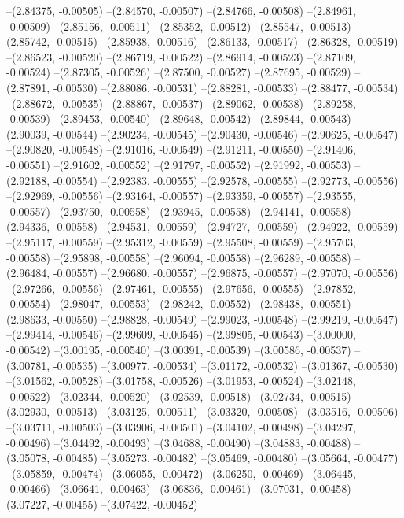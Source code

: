 --(2.84375, -0.00505)
--(2.84570, -0.00507)
--(2.84766, -0.00508)
--(2.84961, -0.00509)
--(2.85156, -0.00511)
--(2.85352, -0.00512)
--(2.85547, -0.00513)
--(2.85742, -0.00515)
--(2.85938, -0.00516)
--(2.86133, -0.00517)
--(2.86328, -0.00519)
--(2.86523, -0.00520)
--(2.86719, -0.00522)
--(2.86914, -0.00523)
--(2.87109, -0.00524)
--(2.87305, -0.00526)
--(2.87500, -0.00527)
--(2.87695, -0.00529)
--(2.87891, -0.00530)
--(2.88086, -0.00531)
--(2.88281, -0.00533)
--(2.88477, -0.00534)
--(2.88672, -0.00535)
--(2.88867, -0.00537)
--(2.89062, -0.00538)
--(2.89258, -0.00539)
--(2.89453, -0.00540)
--(2.89648, -0.00542)
--(2.89844, -0.00543)
--(2.90039, -0.00544)
--(2.90234, -0.00545)
--(2.90430, -0.00546)
--(2.90625, -0.00547)
--(2.90820, -0.00548)
--(2.91016, -0.00549)
--(2.91211, -0.00550)
--(2.91406, -0.00551)
--(2.91602, -0.00552)
--(2.91797, -0.00552)
--(2.91992, -0.00553)
--(2.92188, -0.00554)
--(2.92383, -0.00555)
--(2.92578, -0.00555)
--(2.92773, -0.00556)
--(2.92969, -0.00556)
--(2.93164, -0.00557)
--(2.93359, -0.00557)
--(2.93555, -0.00557)
--(2.93750, -0.00558)
--(2.93945, -0.00558)
--(2.94141, -0.00558)
--(2.94336, -0.00558)
--(2.94531, -0.00559)
--(2.94727, -0.00559)
--(2.94922, -0.00559)
--(2.95117, -0.00559)
--(2.95312, -0.00559)
--(2.95508, -0.00559)
--(2.95703, -0.00558)
--(2.95898, -0.00558)
--(2.96094, -0.00558)
--(2.96289, -0.00558)
--(2.96484, -0.00557)
--(2.96680, -0.00557)
--(2.96875, -0.00557)
--(2.97070, -0.00556)
--(2.97266, -0.00556)
--(2.97461, -0.00555)
--(2.97656, -0.00555)
--(2.97852, -0.00554)
--(2.98047, -0.00553)
--(2.98242, -0.00552)
--(2.98438, -0.00551)
--(2.98633, -0.00550)
--(2.98828, -0.00549)
--(2.99023, -0.00548)
--(2.99219, -0.00547)
--(2.99414, -0.00546)
--(2.99609, -0.00545)
--(2.99805, -0.00543)
--(3.00000, -0.00542)
--(3.00195, -0.00540)
--(3.00391, -0.00539)
--(3.00586, -0.00537)
--(3.00781, -0.00535)
--(3.00977, -0.00534)
--(3.01172, -0.00532)
--(3.01367, -0.00530)
--(3.01562, -0.00528)
--(3.01758, -0.00526)
--(3.01953, -0.00524)
--(3.02148, -0.00522)
--(3.02344, -0.00520)
--(3.02539, -0.00518)
--(3.02734, -0.00515)
--(3.02930, -0.00513)
--(3.03125, -0.00511)
--(3.03320, -0.00508)
--(3.03516, -0.00506)
--(3.03711, -0.00503)
--(3.03906, -0.00501)
--(3.04102, -0.00498)
--(3.04297, -0.00496)
--(3.04492, -0.00493)
--(3.04688, -0.00490)
--(3.04883, -0.00488)
--(3.05078, -0.00485)
--(3.05273, -0.00482)
--(3.05469, -0.00480)
--(3.05664, -0.00477)
--(3.05859, -0.00474)
--(3.06055, -0.00472)
--(3.06250, -0.00469)
--(3.06445, -0.00466)
--(3.06641, -0.00463)
--(3.06836, -0.00461)
--(3.07031, -0.00458)
--(3.07227, -0.00455)
--(3.07422, -0.00452)

